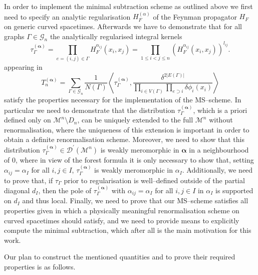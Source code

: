 \documentclass[a4paper,10pt,twoside]{article}
\numberwithin{equation}{section}
\newcounter{and}
\def\M{\mathcal{M}}
\def\D{\mathcal{D}}
\def\G{\mathcal{G}}
\def\balpha{{\boldsymbol{\alpha}}}
\def\beq{\begin{equation}}
\def\eeq{\end{equation}}
\theoremstyle{plain}
\theoremstyle{definition}
\begin{document}
In order to implement the minimal subtraction scheme as outlined above we first need to specify an analytic regularisation $H^{(\alpha)}_F$ of the Feynman propagator $H_F$ on generic curved spacetimes. Afterwards we have to demonstrate that for all graphs $\Gamma\in\G_n$ the analytically regularised integral kernels 
%
\beq\label{def:regularisedamplitudes}
\tau^{(\balpha)}_\Gamma = \prod_{e=(i,j)\in \Gamma} H^{\alpha_{ij}}_F(x_{i},x_{j})=\prod_{1\le i<j\le n} \left(H^{\alpha_{ij}}_F(x_{i},x_{j})\right)^{l_{ij}}.
\eeq
%
appearing in
%
\begin{equation}\label{eq:tau-gamma_reg}
 T^{(\balpha)}_n = \sum_{\Gamma\in \mathcal{G}_n}  \frac{1}{N(\Gamma)}    \left\langle  \tau^{(\balpha)}_\Gamma  , \frac{\delta^{2|E(\Gamma)|}}{   \prod_{i \in V(\Gamma)} \prod_{e \supset i}    \delta \phi_i(x_{i}) } \right\rangle 
\end{equation}
%
satisfy the properties necessary for the implementation of the MS--scheme. In particular we need to demonstrate that the distribution $\tau^{(\balpha)}_\Gamma$, which is a priori defined only on $\M^n\setminus D_n$, can be uniquely extended to the full $\M^n$ without renormalisation, where the uniqueness of this extension is important in order to obtain a definite renormalisation scheme. Moreover, we need to show that this distribution $\tau^{(\balpha)}_\Gamma\in\D^\prime(\M^n)$ is weakly meromorphic in $\balpha$ in a neighbourhood of 0, where in view of the forest formula it is only necessary to show that, setting $\alpha_{ij}=\alpha_I$ for all $i,j\in I$, $\tau^{(\balpha)}_\Gamma$ is weakly meromorphic in $\alpha_I$. Additionally, we need to prove that, if $\tau_\Gamma$ prior to regularisation is well--defined outside of the partial diagonal $d_{I}$, then the pole of $\tau^{(\balpha)}_\Gamma$ with $\alpha_{ij}=\alpha_I$ for all $i,j\in I$ in $\alpha_I$ is supported on $d_I$ and thus local. Finally, we need to prove that our MS--scheme satisfies all properties given in \cite{Hollands:2001b,Hollands:2004yh} which a physically meaningful renormalisation scheme on curved spacetimes should satisfy, and we need to provide means to explicitly compute the minimal subtraction, which after all is the main motivation for this work.

Our plan to construct the mentioned quantities and to prove their required properties is as follows.
\end{document}
